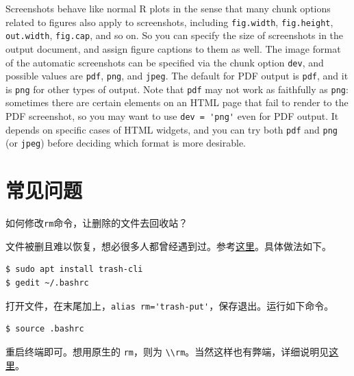 \documentclass[doctor,openright,twoside]{sjtuthesis}
\newcommand\setholdfigure{\floatplacement{figure}{H}}
\newcommand{\passthrough}[1]{#1}
\theoremstyle{plain}
\theoremstyle{definition}
\theoremstyle{remark}
\theoremstyle{ocrenumbox}
\theoremstyle{plain}
\let\BeginKnitrBlock\begin \let\EndKnitrBlock\end
\begin{document}
Screenshots behave like normal R plots in the sense that many chunk
options related to figures also apply to screenshots, including
\passthrough{\lstinline!fig.width!},
\passthrough{\lstinline!fig.height!},
\passthrough{\lstinline!out.width!}, \passthrough{\lstinline!fig.cap!},
and so on. So you can specify the size of screenshots in the output
document, and assign figure captions to them as well. The image format
of the automatic screenshots can be specified via the chunk option
\passthrough{\lstinline!dev!}, and possible values are
\passthrough{\lstinline!pdf!}, \passthrough{\lstinline!png!}, and
\passthrough{\lstinline!jpeg!}. The default for PDF output is
\passthrough{\lstinline!pdf!}, and it is \passthrough{\lstinline!png!}
for other types of output. Note that \passthrough{\lstinline!pdf!} may
not work as faithfully as \passthrough{\lstinline!png!}: sometimes there
are certain elements on an HTML page that fail to render to the PDF
screenshot, so you may want to use \passthrough{\lstinline!dev = 'png'!}
even for PDF output. It depends on specific cases of HTML widgets, and
you can try both \passthrough{\lstinline!pdf!} and
\passthrough{\lstinline!png!} (or \passthrough{\lstinline!jpeg!}) before
deciding which format is more desirable.

\hypertarget{chap:faqs}{%
\chapter{常见问题}\label{chap:faqs}}

\setholdfigure

\BeginKnitrBlock{question}
如何修改\passthrough{\lstinline!rm!}命令，让删除的文件去回收站？
\EndKnitrBlock{question}

\BeginKnitrBlock{answer}
文件被删且难以恢复，想必很多人都曾经遇到过。参考\href{https://bbs.deepin.org/forum.php?mod=redirect\&goto=findpost\&ptid=159778\&pid=487081\&fromuid=16639}{这里}。具体做法如下。

\begin{lstlisting}[language=bash, numbers=none]
$ sudo apt install trash-cli
$ gedit ~/.bashrc
\end{lstlisting}

打开文件，在末尾加上，\passthrough{\lstinline!alias rm='trash-put'!}，保存退出。运行如下命令。

\begin{lstlisting}[language=bash, numbers=none]
$ source .bashrc
\end{lstlisting}

重启终端即可。想用原生的 \passthrough{\lstinline!rm!}，则为
\passthrough{\lstinline!\\rm!}。当然这样也有弊端，详细说明见\href{https://bbs.deepin.org/forum.php?mod=redirect\&goto=findpost\&ptid=159778\&pid=487121\&fromuid=16639}{这里}。
\EndKnitrBlock{answer}
\end{document}
